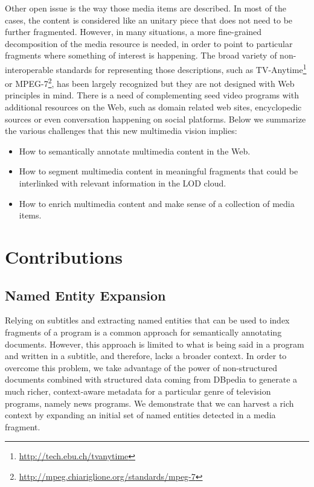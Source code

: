 \documentclass[a4paper,11pt]{report}
\begin{document}
Other open issue is the way those media items are described. In most of the cases, the content is considered like an unitary piece that does not need to be further fragmented. However, in many situations, a more fine-grained decomposition of the media resource is needed, in order to point to particular fragments where something of interest is happening. The broad variety of non-interoperable standards for representing those descriptions, such as TV-Anytime\footnote{\url{http://tech.ebu.ch/tvanytime}} or MPEG-7\footnote{\url{http://mpeg.chiariglione.org/standards/mpeg-7}}, has been largely recognized but they are not designed with Web principles in mind. There is a need of complementing seed video programs with additional resources on the Web, such as domain related web sites, encyclopedic sources or even conversation happening on social platforms. Below we summarize the various challenges that this new multimedia vision implies:
\begin{itemize}
 \item How to semantically annotate multimedia content in the Web.
 \item How to segment multimedia content in meaningful fragments that could be interlinked with relevant information in the LOD cloud.
 \item How to enrich multimedia content and make sense of a collection of media items.
\end{itemize}

\chapter{Contributions}
\section{Named Entity Expansion} \label{expansion}
Relying on subtitles and extracting named entities that can be used to index fragments of a program is a common approach for semantically annotating documents. However, this approach is limited to what is being said in a program and written in a subtitle, and therefore, lacks a broader context. In order to overcome this problem, we take advantage of the power of non-structured documents combined with structured data coming from DBpedia to generate a much richer, context-aware metadata for a particular genre of television programs, namely news programs. We demonstrate that we can harvest a rich context by expanding an initial set of named entities detected in a media fragment.
\end{document}
